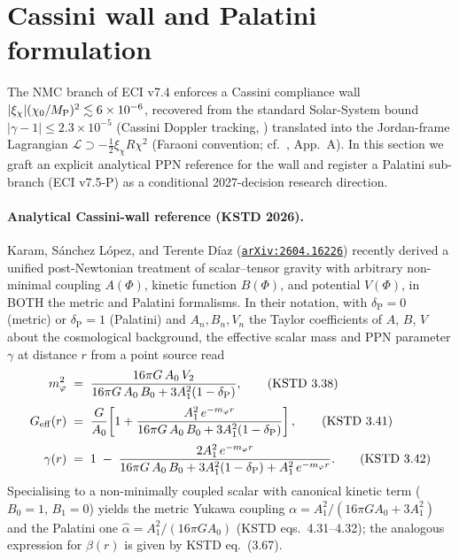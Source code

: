 \documentclass[a4paper,11pt]{article}
\newcommand{\arXiv}[1]{\href{https://arxiv.org/abs/#1}{\texttt{arXiv:#1}}}
\theoremstyle{definition}
\theoremstyle{remark}
\begin{document}
\section{Cassini wall and Palatini formulation}
\label{sec:cassini-palatini}

The NMC branch of ECI v7.4 enforces a Cassini compliance wall
$|\xi_\chi|(\chi_0/M_{\rm P})^2 \lesssim 6\times 10^{-6}$, recovered from
the standard Solar-System bound $|\gamma-1|\le 2.3\times 10^{-5}$
(Cassini Doppler tracking, \cite{Bertotti03}) translated into the
Jordan-frame Lagrangian $\mathcal{L}\supset -\tfrac{1}{2}\xi_\chi R\chi^2$
(Faraoni convention; cf.\ \cite{Wolf25}, App.~A).  In this section we
graft an explicit analytical PPN reference for the wall and
register a Palatini sub-branch (ECI v7.5-P) as a conditional
2027-decision research direction.

\paragraph{Analytical Cassini-wall reference (KSTD 2026).}
Karam, S\'anchez L\'opez, and Terente D\'iaz \cite{KSTD26}
(\arXiv{2604.16226}) recently derived a unified post-Newtonian
treatment of scalar--tensor gravity with arbitrary non-minimal
coupling $A(\Phi)$, kinetic function $B(\Phi)$, and potential
$V(\Phi)$, in BOTH the metric and Palatini formalisms.  In their
notation, with $\delta_{\mathrm P}=0$ (metric) or $\delta_{\mathrm P}=1$
(Palatini) and $A_n,B_n,V_n$ the Taylor coefficients of $A$, $B$, $V$
about the cosmological background, the effective scalar mass and
PPN parameter $\gamma$ at distance $r$ from a point source read
\begin{align}
   m_\varphi^2 &\;=\; \frac{16\pi G\,A_0\,V_2}
                      {16\pi G\,A_0\,B_0 + 3A_1^2(1-\delta_{\mathrm P})} ,
   \tag{KSTD~3.38}\\[2pt]
   G_{\rm eff}(r) &\;=\; \frac{G}{A_0}\!
     \left[1 + \frac{A_1^2\,e^{-m_\varphi r}}
                    {16\pi G\,A_0\,B_0 + 3A_1^2(1-\delta_{\mathrm P})}\right] ,
   \tag{KSTD~3.41}\\[2pt]
   \gamma(r) &\;=\; 1 \;-\; \frac{2A_1^2\,e^{-m_\varphi r}}
        {16\pi G\,A_0\,B_0 + 3A_1^2(1-\delta_{\mathrm P}) + A_1^2\,e^{-m_\varphi r}} .
   \tag{KSTD~3.42}
\end{align}
Specialising to a non-minimally coupled scalar with canonical
kinetic term ($B_0=1$, $B_1=0$) yields the metric Yukawa coupling
$\alpha = A_1^2/(16\pi G A_0 + 3A_1^2)$ and the Palatini one
$\hat\alpha = A_1^2/(16\pi G A_0)$ (KSTD eqs.~4.31--4.32);
the analogous expression for $\beta(r)$ is given by KSTD eq.~(3.67).
\end{document}
